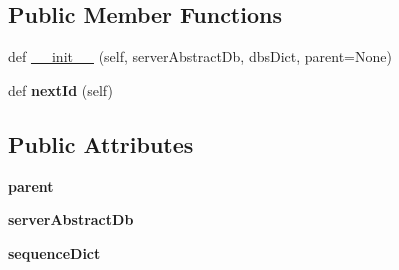 \subsection*{Public Member Functions}
\begin{DoxyCompactItemize}
\item 
def \mbox{\hyperlink{class_dsg_tools_1_1_user_tools_1_1_permission_manager_wizard_1_1permission_wizard_1_1_permission_wizard_a1bc734c9c8070450e9a881fed077bc8c}{\+\_\+\+\_\+init\+\_\+\+\_\+}} (self, server\+Abstract\+Db, dbs\+Dict, parent=None)
\item 
\mbox{\label{class_dsg_tools_1_1_user_tools_1_1_permission_manager_wizard_1_1permission_wizard_1_1_permission_wizard_ad1e1b7c5969fb4d1030c05d8936c501b}} 
def {\bfseries next\+Id} (self)
\end{DoxyCompactItemize}
\subsection*{Public Attributes}
\begin{DoxyCompactItemize}
\item 
\mbox{\label{class_dsg_tools_1_1_user_tools_1_1_permission_manager_wizard_1_1permission_wizard_1_1_permission_wizard_a0b4a5ce26b93874b0697e2a5f4f5dc17}} 
{\bfseries parent}
\item 
\mbox{\label{class_dsg_tools_1_1_user_tools_1_1_permission_manager_wizard_1_1permission_wizard_1_1_permission_wizard_a487ea2cb5612e06d7e431af7df1f1de8}} 
{\bfseries server\+Abstract\+Db}
\item 
\mbox{\label{class_dsg_tools_1_1_user_tools_1_1_permission_manager_wizard_1_1permission_wizard_1_1_permission_wizard_af98a260f7817b0807c3afb48f1b32539}} 
{\bfseries sequence\+Dict}
\end{DoxyCompactItemize}


